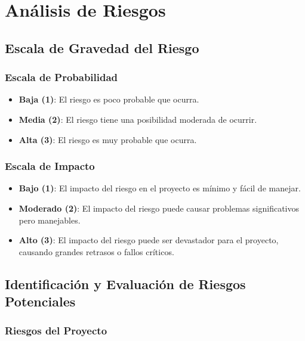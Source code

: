 \section{Análisis de Riesgos}

\subsection{Escala de Gravedad del Riesgo}

\subsubsection{Escala de Probabilidad}

\begin{itemize}
    \item \textbf{Baja (1)}: El riesgo es poco probable que ocurra.
    \item \textbf{Media (2)}: El riesgo tiene una posibilidad moderada de ocurrir.
    \item \textbf{Alta (3)}: El riesgo es muy probable que ocurra.
\end{itemize}

\subsubsection{Escala de Impacto}

\begin{itemize}
    \item \textbf{Bajo (1)}: El impacto del riesgo en el proyecto es mínimo y fácil de manejar.
    \item \textbf{Moderado (2)}: El impacto del riesgo puede causar problemas significativos pero manejables.
    \item \textbf{Alto (3)}: El impacto del riesgo puede ser devastador para el proyecto, causando grandes retrasos o fallos críticos.
\end{itemize}

\subsection{Identificación y Evaluación de Riesgos Potenciales}

\subsubsection{Riesgos del Proyecto}

